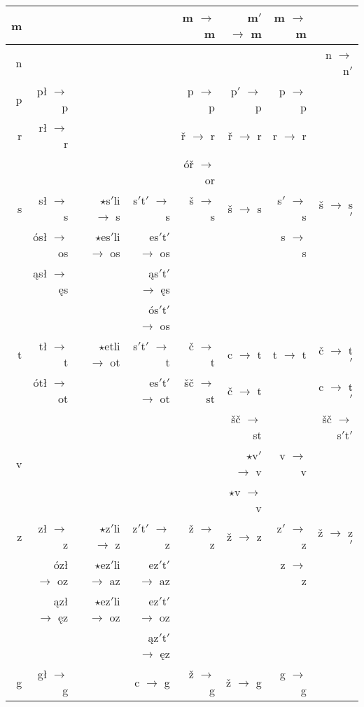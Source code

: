\documentclass{article}
\begin{document}
\begin{longtable}{r|rrrrrrr}
m &  &  &  & m $\rightarrow$ m & m$'$ $\rightarrow$ m & m $\rightarrow$ m & \\
\hline
n &  &  &  &  &  &  & n $\rightarrow$ n$'$\\
\hline
p & pł $\rightarrow$ p &  &  & p $\rightarrow$ p & p$'$ $\rightarrow$ p & p $\rightarrow$ p & \\
\hline
r & rł $\rightarrow$ r &  &  & ř $\rightarrow$ r & ř $\rightarrow$ r & r $\rightarrow$ r & \\
 &  &  &  & óř $\rightarrow$ or &  &  & \\
\hline
s & sł $\rightarrow$ s & $\star$s$'$li $\rightarrow$ s & s$'$t$'$ $\rightarrow$ s & š $\rightarrow$ s & š $\rightarrow$ s & s$'$ $\rightarrow$ s & š $\rightarrow$ s$'$\\
 & ósł $\rightarrow$ os & $\star$es$'$li $\rightarrow$ os & es$'$t$'$ $\rightarrow$ os &  &  & s $\rightarrow$ s & \\
 & ąsł $\rightarrow$ ęs &  & ąs$'$t$'$ $\rightarrow$ ęs &  &  &  & \\
 &  &  & ós$'$t$'$ $\rightarrow$ os &  &  &  & \\
\hline
t & tł $\rightarrow$ t & $\star$etli $\rightarrow$ ot & s$'$t$'$ $\rightarrow$ t & č $\rightarrow$ t & c $\rightarrow$ t & t $\rightarrow$ t & č $\rightarrow$ t$'$\\
 & ótł $\rightarrow$ ot &  & es$'$t$'$ $\rightarrow$ ot & šč $\rightarrow$ st & č $\rightarrow$ t &  & c $\rightarrow$ t$'$\\
 &  &  &  &  & šč $\rightarrow$ st &  & šč $\rightarrow$ s$'$t$'$\\
\hline
v &  &  &  &  & $\star$v$'$ $\rightarrow$ v & v $\rightarrow$ v & \\
 &  &  &  &  & $\star$v $\rightarrow$ v &  & \\
\hline
z & zł $\rightarrow$ z & $\star$z$'$li $\rightarrow$ z & z$'$t$'$ $\rightarrow$ z & ž $\rightarrow$ z & ž $\rightarrow$ z & z$'$ $\rightarrow$ z & ž $\rightarrow$ z$'$\\
 & ózł $\rightarrow$ oz & $\star$ez$'$li $\rightarrow$ az & ez$'$t$'$ $\rightarrow$ az &  &  & z $\rightarrow$ z & \\
 & ązł $\rightarrow$ ęz & $\star$ez$'$li $\rightarrow$ oz & ez$'$t$'$ $\rightarrow$ oz &  &  &  & \\
 &  &  & ąz$'$t$'$ $\rightarrow$ ęz &  &  &  & \\
\hline
g & gł $\rightarrow$ g &  & c $\rightarrow$ g & ž $\rightarrow$ g & ž $\rightarrow$ g & g $\rightarrow$ g & \\

\end{longtable}
\end{document}
